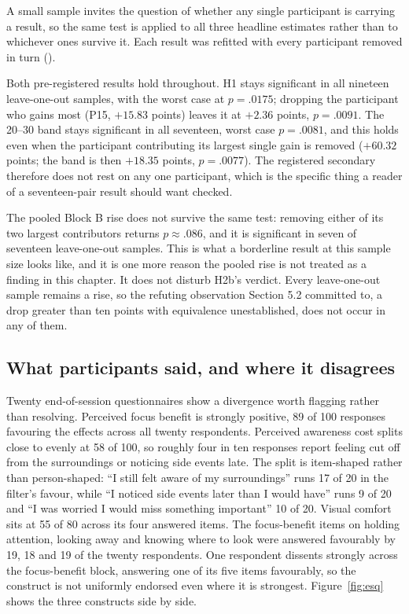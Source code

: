 A small sample invites the question of whether any single participant is carrying a result, so the
same test is applied to all three headline estimates rather than to whichever ones survive it. Each
result was refitted with every participant removed in turn
().

Both pre-registered results hold throughout. H1 stays significant in all nineteen leave-one-out
samples, with the worst case at $p = .0175$; dropping the participant who gains most (P15, $+15.83$
points) leaves it at $+2.36$ points, $p = .0091$. The 20--30\textdegree{} band stays significant in
all seventeen, worst case $p = .0081$, and this holds even when the participant contributing its
largest single gain is removed ($+60.32$ points; the band is then $+18.35$ points, $p = .0077$). The
registered secondary therefore does not rest on any one participant, which is the specific thing a
reader of a seventeen-pair result should want checked.

The pooled Block B rise does not survive the same test:
removing either of its two largest contributors returns $p \approx .086$, and it is significant in
seven of seventeen leave-one-out samples. This is what a borderline result at this sample size looks
like, and it is one more reason the pooled rise is not treated as a finding in this chapter. It does
not disturb H2b's verdict. Every leave-one-out sample remains a rise, so the refuting observation
Section 5.2 committed to, a drop greater than ten points with equivalence unestablished, does not
occur in any of them.

\subsection{What participants said, and where it disagrees}

Twenty end-of-session questionnaires show a divergence worth flagging rather than resolving.
Perceived focus benefit is strongly positive, 89 of 100 responses favouring the effects across all
twenty respondents. Perceived
awareness cost splits close to evenly at 58 of 100, so roughly four in ten responses report feeling
cut off from the surroundings or noticing side events late. The split is item-shaped rather than
person-shaped: ``I still felt aware of my surroundings'' runs 17 of 20 in the filter's favour, while
``I noticed side events later than I would have'' runs 9 of 20 and ``I was worried I would miss
something important'' 10 of 20. Visual comfort sits at 55 of 80 across its four answered items. The focus-benefit
items on holding attention, looking away and knowing where to look were answered favourably by 19,
18 and 19 of the twenty respondents. One respondent dissents strongly across the focus-benefit block,
answering one of its five items favourably, so the construct is not uniformly endorsed even where it
is strongest. Figure~\ref{fig:esq} shows the three constructs side by side.


